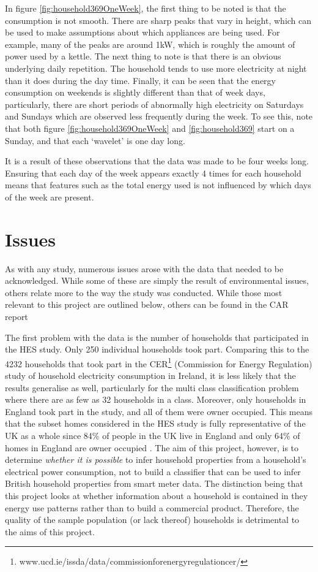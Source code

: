 In figure \ref{fig:household369OneWeek}, the first thing to be noted is that the consumption is not smooth. There are sharp peaks that vary in height, which can be used to make assumptions about which appliances are being used. For example, many of the peaks  are around 1kW, which is roughly the amount of power used by a kettle. The next thing to note is that there is an obvious underlying daily repetition. The household tends to use more electricity at night than it does during the day time. Finally, it can be seen that the energy consumption on weekends is slightly different than that of week days, particularly, there are short periods of abnormally high electricity on Saturdays and Sundays which are observed less frequently during the week. To see this, note that both figure \ref{fig:household369OneWeek} and \ref{fig:household369} start on a Sunday, and that each `wavelet' is one day long.

It is a result of these observations that the data was made to be four weeks long. Ensuring that each day of the week appears exactly 4 times for each household means that features such as the total energy used is not influenced by which days of the week are present.

\householdOneWeek
\householdPlot




\section{Issues}

As with any study, numerous issues arose with the data that needed to be acknowledged. While some of these are simply the result of environmental issues, others relate more to the way the study was conducted. While those most relevant to this project are outlined below, others can be found in the CAR report \cite{early_findings}

The first problem with the data is the number of households that participated in the HES study. Only 250 individual households took part. Comparing this to the 4232 households that took part in the CER\footnote{www.ucd.ie/issda/data/commissionforenergyregulationcer/} (Commission for Energy Regulation) study of household electricity consumption in Ireland, it is less likely that the results generalise as well, particularly for the multi class classification problem where there are as few as 32 households in a class. Moreover, only households in England took part in the study, and all of them were owner occupied. This means that the subset homes considered in the HES study is fully representative of the UK as a whole since 84\% of people in the UK live in England and only 64\% of homes in England are owner occupied \cite{ONS}. The aim of this project, however, is to determine \textit{whether it is possible} to infer household properties from a household's electrical power consumption, not to build a classifier that can be used to infer British household properties from smart meter data. The distinction being that this project looks at whether information about a household is contained in they energy use patterns rather than to build a commercial product. Therefore, the quality of the sample population (or lack thereof) households is detrimental to the aims of this project.

